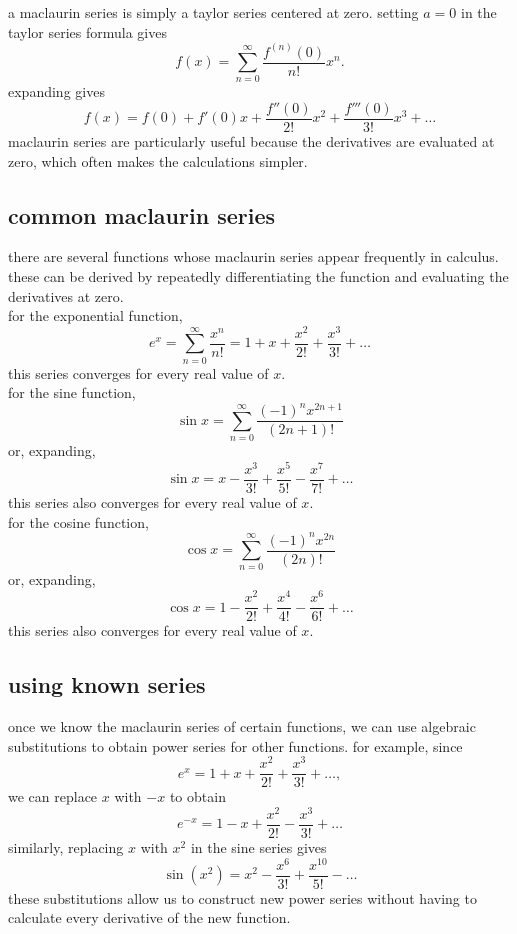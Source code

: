 \documentclass{article}
\begin{document}
a maclaurin series is simply a taylor series centered at zero. setting $a=0$ in the taylor series formula gives
\[
\boxed{
f(x)=
\sum_{n=0}^{\infty}
\frac{f^{(n)}(0)}{n!}x^n.
}
\]
expanding gives
\[
f(x)=f(0)+f'(0)x
+\frac{f''(0)}{2!}x^2
+\frac{f'''(0)}{3!}x^3+\ldots
\]
maclaurin series are particularly useful because the derivatives are evaluated at zero, which often makes the calculations simpler.\\

\subsection{common maclaurin series}

there are several functions whose maclaurin series appear frequently in calculus. these can be derived by repeatedly differentiating the function and evaluating the derivatives at zero.\\

for the exponential function,
\[
\boxed{
e^x=
\sum_{n=0}^{\infty}\frac{x^n}{n!}
=
1+x+\frac{x^2}{2!}+\frac{x^3}{3!}+\ldots
}
\]
this series converges for every real value of $x$.\\

for the sine function,
\[
\boxed{
\sin x=
\sum_{n=0}^{\infty}
\frac{(-1)^n x^{2n+1}}{(2n+1)!}
}
\]
or, expanding,
\[
\sin x=
x-\frac{x^3}{3!}
+\frac{x^5}{5!}
-\frac{x^7}{7!}+\ldots
\]
this series also converges for every real value of $x$.\\

for the cosine function,
\[
\boxed{
\cos x=
\sum_{n=0}^{\infty}
\frac{(-1)^n x^{2n}}{(2n)!}
}
\]
or, expanding,
\[
\cos x=
1-\frac{x^2}{2!}
+\frac{x^4}{4!}
-\frac{x^6}{6!}+\ldots
\]
this series also converges for every real value of $x$.\\

\subsection{using known series}

once we know the maclaurin series of certain functions, we can use algebraic substitutions to obtain power series for other functions. for example, since
\[
e^x=1+x+\frac{x^2}{2!}+\frac{x^3}{3!}+\ldots,
\]
we can replace $x$ with $-x$ to obtain
\[
e^{-x}
=
1-x+\frac{x^2}{2!}
-\frac{x^3}{3!}+\ldots
\]
similarly, replacing $x$ with $x^2$ in the sine series gives
\[
\sin(x^2)
=
x^2-\frac{x^6}{3!}
+\frac{x^{10}}{5!}-\ldots
\]
these substitutions allow us to construct new power series without having to calculate every derivative of the new function.\\
\end{document}
